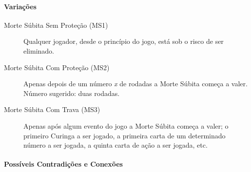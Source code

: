 \paragraph{Variações}

\begin{description}
\item[Morte Súbita Sem Proteção (MS1)]{Qualquer jogador, desde o princípio do jogo, está sob o risco de ser eliminado.}
\item[Morte Súbita Com Proteção (MS2)]{Apenas depois de um número \textit{x} de rodadas a Morte Súbita começa a valer. Número sugerido: duas rodadas.}
\item[Morte Súbita Com Trava (MS3)]{Apenas após algum evento do jogo a Morte Súbita começa a valer; o primeiro Curinga a ser jogado, a primeira carta de um determinado número a ser jogada, a quinta carta de ação a ser jogada, etc.}
\end{description}

\paragraph{Possíveis Contradições e Conexões}

